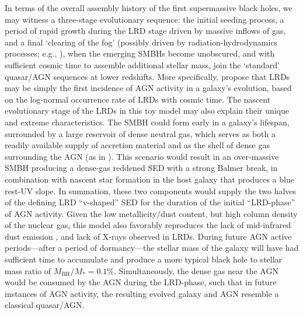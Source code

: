 \documentclass[twocolumn]{aastex7}
\begin{document}
In terms of the overall assembly history of the first supermassive black holes, we may witness a three-stage evolutionary sequence: the initial seeding process, a period of rapid growth during the LRD stage driven by massive inflows of gas, and a final `clearing of the fog' (possibly driven by radiation-hydrodynamics processes; e.g., \citealt{Smith_DCBH2017}), when the emerging SMBHs become unobscured, and with sufficient cosmic time to assemble additional stellar mass, join the `standard' quasar/AGN sequences at lower redshifts.
More specifically, \citet{inayoshi25b} propose that LRDs may be simply the first incidence of AGN activity in a galaxy's evolution, based on the log-normal occurrence rate of LRDs with cosmic time. 
The nascent evolutionary stage of the LRDs in this toy model may also explain their unique and extreme characteristics. 
The SMBH could form early in a galaxy's lifespan, surrounded by a large reservoir of dense neutral gas, which serves as both a readily available supply of accretion material and as the shell of dense gas surrounding the AGN (as in \citealt{inayoshi25}). 
This scenario would result in an over-massive SMBH producing a dense-gas reddened SED with a strong Balmer break, in combination with nascent star formation in the host galaxy that produces a blue rest-UV slope. 
In summation, these two components would supply the two halves of the defining LRD ``v-shaped'' SED for the duration of the initial ``LRD-phase'' of AGN activity. 
Given the low metallicity/dust content, but high column density of the nuclear gas, this model also favorably reproduces the lack of mid-infrared dust emission \citep{Williams24,PerezGonzalez24,akins24,leung24}, and lack of X-rays \citep{yue24xray,maiolino25, lambrides24} observed in LRDs. 
During future AGN active periods---after a period of dormancy---the stellar mass of the galaxy will have had sufficient time to accumulate and produce a more typical black hole to stellar mass ratio of $M_{\textrm{BH}}/M_{*}=0.1\%$. 
Simultaneously, the dense gas near the AGN would be consumed by the AGN during the LRD-phase, such that in future instances of AGN activity, the resulting evolved galaxy and AGN resemble a classical quasar/AGN. 
\end{document}
